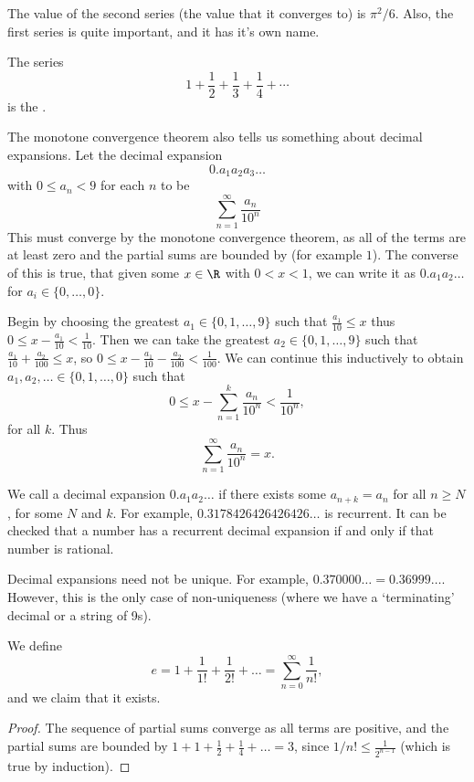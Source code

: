 The value of the second series (the value that it converges to) is $\pi^2 / 6$. Also, the first series is quite important, and it has it's own name.

\begin{definition}
The series
$$
1 + \frac{1}{2} + \frac{1}{3} + \frac{1}{4} + \cdots
$$
is the .
\end{definition}

The monotone convergence theorem also tells us something about decimal expansions. Let the decimal expansion
$$
0.a_1 a_2 a_3 \dots
$$
with $0 \leq a_n < 9$ for each $n$ to be 
$$
\sum_{n = 1}^\infty \frac{a_n}{10^n}
$$
This must converge by the monotone convergence theorem, as all of the terms are at least zero and the partial sums are bounded by (for example $1$).
The converse of this is true, that given some $x \in \R$ with $0 < x < 1$, we can write it as $0.a_1 a_2 \dots$ for $a_i \in \{0, \dots, 0\}$.

Begin by choosing the greatest $a_1 \in \{0, 1, \dots, 9\}$ such that
$
\frac{a_1}{10}\leq x
$
thus $0 \leq x - \frac{a_1}{10} < \frac{1}{10}$. Then we can take the greatest $a_2 \in \{0, 1, \dots, 9\}$ such that $\frac{a_1}{10} + \frac{a_2}{100} \leq x$, so $0 \leq x - \frac{a_1}{10} - \frac{a_2}{100} < \frac{1}{100}$. We can continue this inductively to obtain $a_1, a_2, \dots \in \{0, 1, \dots, 0\}$ such that
$$
0 \leq x - \sum_{n = 1}^k \frac{a_n}{10^n} < \frac{1}{10^n},
$$
for all $k$. Thus
$$
\sum_{n = 1}^{\infty} \frac{a_n}{10^n} = x.
$$

\begin{remark}
	We call a decimal expansion $0.a_1 a_2 \dots$  if there exists some $a_{n + k} = a_n$ for all $n \geq N$, for some $N$ and $k$. For example, $0.3178426426426426\dots$ is recurrent. It can be checked that a number has a recurrent decimal expansion if and only if that number is rational. 
\end{remark}
\begin{remark}
	Decimal expansions need not be unique. For example, $0.370000\dots = 0.36999\dots$. However, this is the only case of non-uniqueness (where we have a `terminating' decimal or a string of 9s).
\end{remark}

\begin{theorem}[$e$ Exists]
	We define
	$$
	e = 1 + \frac{1}{1!} + \frac{1}{2!} + \dots = \sum_{n = 0}^\infty \frac{1}{n!},
	$$
	and we claim that it exists.
\end{theorem}
\begin{proof}
	The sequence of partial sums converge as all terms are positive, and the partial sums are bounded by $1 + 1 + \frac{1}{2} + \frac{1}{4} + \dots = 3$, since $1/n! \leq \frac{1}{2^{n - 1}}$ (which is true by induction).
\end{proof}

